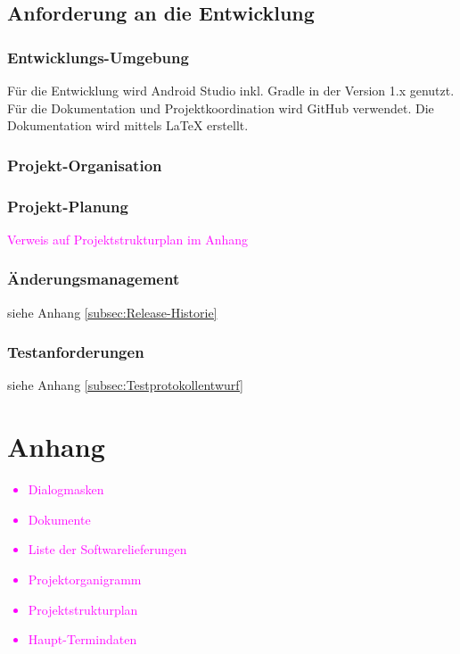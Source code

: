 \subsection{\textbf{Anforderung an die Entwicklung}}

\subsubsection{Entwicklungs-Umgebung}
Für die Entwicklung wird Android Studio inkl. Gradle in der Version 1.x genutzt. Für die Dokumentation und Projektkoordination wird GitHub verwendet.
Die Dokumentation wird mittels \LaTeX{} erstellt.



\subsubsection{Projekt-Organisation}



\subsubsection{Projekt-Planung}
\textcolor{magenta}{Verweis auf Projektstrukturplan im Anhang}

\subsubsection{Änderungsmanagement}
siehe Anhang \ref{subsec:Release-Historie}

\subsubsection{Testanforderungen}
siehe Anhang \ref{subsec:Testprotokollentwurf}



\section{Anhang}

\textcolor{magenta}{
\begin{itemize}
	\item Dialogmasken
	\item Dokumente
	\item Liste der Softwarelieferungen
	\item Projektorganigramm
	\item Projektstrukturplan
	\item Haupt-Termindaten
\end{itemize}
}